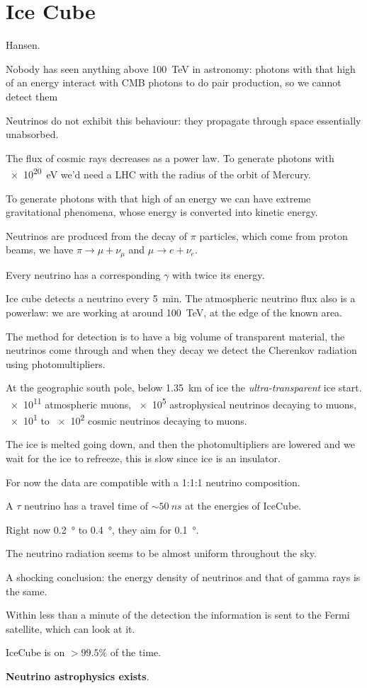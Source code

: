 \documentclass[main.tex]{subfiles}
\begin{document}
\section{Ice Cube}

Hansen.

Nobody has seen anything above \SI{100}{TeV} in astronomy: 
photons with that high of an energy interact with CMB photons to do pair production, so we cannot detect them

Neutrinos do not exhibit this behaviour: they propagate through space essentially unabsorbed.

The flux of cosmic rays decreases as a power law. To generate photons with \SI{e20}{eV} we'd need a LHC with the radius of the orbit of Mercury.

To generate photons with that high of an energy we can have extreme gravitational phenomena, whose energy is converted into kinetic energy. 

Neutrinos are produced from the decay of \(\pi \) particles, which come from proton beams, we have \(\pi \rightarrow \mu + \nu_{\mu } \) and \(\mu \rightarrow e + \nu_{e}\). 

Every neutrino has a corresponding \(\gamma \) with twice its energy.

Ice cube detects a neutrino every \SI{5}{min}. 
The atmospheric neutrino flux also is a powerlaw: we are working at around \SI{100}{TeV}, at the edge of the known area. 

The method for detection is to have a big volume of transparent material, the neutrinos come through and when they decay we detect the Cherenkov radiation using photomultipliers. 

At the geographic south pole, below \SI{1.35}{km} of ice the \emph{ultra-transparent} ice start. 
\num{e11} atmospheric muons, \num{e5} astrophysical neutrinos decaying to muons, \num{e1} to \num{e2} cosmic neutrinos decaying to muons. 

The ice is melted going down, and then the photomultipliers are lowered and we wait for the ice to refreeze, this is slow since ice is an insulator. 

For now the data are compatible with a 1:1:1 neutrino composition. 

A \(\tau \) neutrino has a travel time of \(\sim \SI{50}{ns}\) at the energies of IceCube. 


Right now \SI{.2}{\degree} to \SI{.4}{\degree}, they aim for \SI{.1}{\degree}.

The neutrino radiation seems to be almost uniform throughout the sky. 

A shocking conclusion: the energy density of neutrinos and that of gamma rays is the same. 

Within less than a minute of the detection the information is sent to the Fermi satellite, which can look at it. 

IceCube is on \(> 99.5\%\) of the time. 

\textbf{Neutrino astrophysics exists}. 
\end{document}

